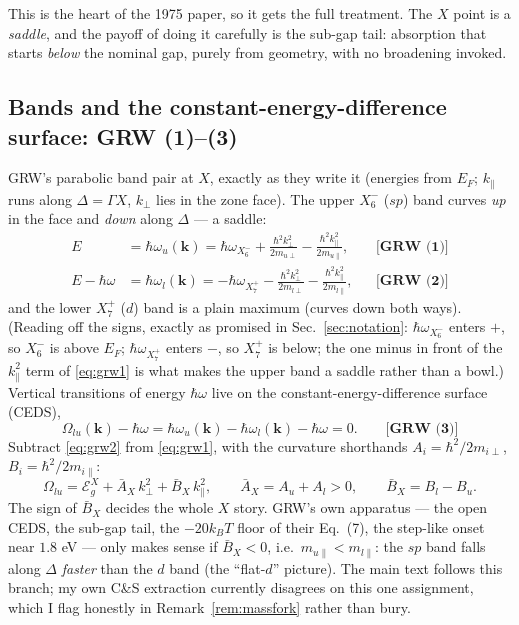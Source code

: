 \documentclass[11pt,a4paper]{article}
\numberwithin{equation}{section}
\newcommand{\hw}{\hbar\omega}
\newcommand{\EgX}{\mathcal{E}_g^{X}}
\newcommand{\AX}{\bar{A}_X}
\newcommand{\BX}{\bar{B}_X}
\newcommand{\kperp}{k_{\perp}}
\newcommand{\kpar}{k_{\parallel}}
\newcommand{\wXsix}{\hbar\omega_{X_6^-}}
\newcommand{\wXseven}{\hbar\omega_{X_7^+}}
\newcommand{\grweq}[1]{\textbf{[GRW~(#1)]}}
\begin{document}
This is the heart of the 1975 paper, so it gets the full treatment.
The $X$ point is a \emph{saddle}, and the payoff of doing it carefully
is the sub-gap tail: absorption that starts \emph{below} the nominal
gap, purely from geometry, with no broadening invoked.

\subsection{Bands and the constant-energy-difference surface: GRW (1)--(3)}

GRW's parabolic band pair at $X$, exactly as they write it (energies
from $E_F$; $\kpar$ runs along $\Delta=\Gamma X$, $\kperp$ lies in the
zone face). The upper $X_6^-$ ($sp$) band curves \emph{up} in the face
and \emph{down} along $\Delta$ --- a saddle:
\begin{align}
E&=\hbar\omega_u(\mathbf k)
=\wXsix+\frac{\hbar^2\kperp^2}{2m_{u\perp}}
        -\frac{\hbar^2\kpar^2}{2m_{u\parallel}},
&&\grweq{1}
\label{eq:grw1}\\[2pt]
E-\hw&=\hbar\omega_l(\mathbf k)
=-\wXseven-\frac{\hbar^2\kperp^2}{2m_{l\perp}}
          -\frac{\hbar^2\kpar^2}{2m_{l\parallel}},
&&\grweq{2}
\label{eq:grw2}
\end{align}
and the lower $X_7^+$ ($d$) band is a plain maximum (curves down both
ways). (Reading off the signs, exactly as promised in
Sec.~\ref{sec:notation}: $\wXsix$ enters $+$, so $X_6^-$ is above
$E_F$; $\wXseven$ enters $-$, so $X_7^+$ is below; the one minus in
front of the $\kpar^2$ term of \eqref{eq:grw1} is what makes the upper
band a saddle rather than a bowl.) Vertical transitions of energy
$\hw$ live on the constant-energy-difference surface (CEDS),
\begin{equation}
\Omega_{lu}(\mathbf k)-\hw=
\hbar\omega_u(\mathbf k)-\hbar\omega_l(\mathbf k)-\hw=0 .
\qquad\grweq{3}
\label{eq:grw3}
\end{equation}
Subtract \eqref{eq:grw2} from \eqref{eq:grw1}, with the curvature
shorthands $A_i=\hbar^2/2m_{i\perp}$, $B_i=\hbar^2/2m_{i\parallel}$:
\begin{equation}
\Omega_{lu}=\EgX+\AX\,\kperp^2+\BX\,\kpar^2,
\qquad
\AX=A_u+A_l>0,\qquad
\BX=B_l-B_u .
\label{eq:OmegaX}
\end{equation}
The sign of $\BX$ decides the whole $X$ story. GRW's own apparatus ---
the open CEDS, the sub-gap tail, the $-20k_BT$ floor of their
Eq.~(7), the step-like onset near $1.8$ eV --- only makes sense if
$\boxed{\BX<0}$, i.e.\ $m_{u\parallel}<m_{l\parallel}$: the $sp$ band
falls along $\Delta$ \emph{faster} than the $d$ band (the ``flat-$d$''
picture). The main text follows this branch; my own C\&S extraction
currently disagrees on this one assignment, which I flag honestly in
Remark~\ref{rem:massfork} rather than bury.
\end{document}
